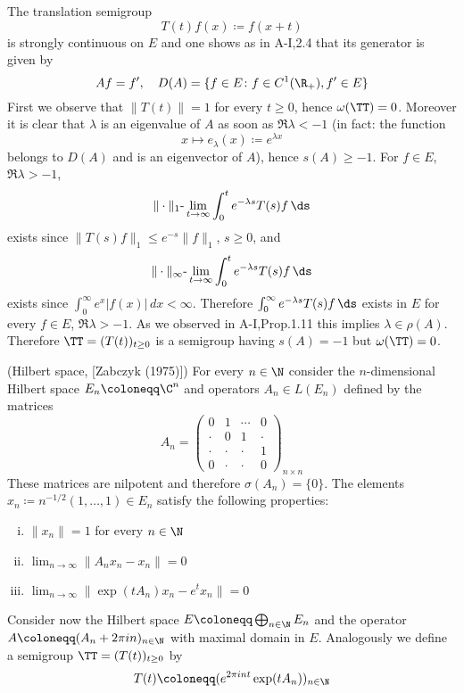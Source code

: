 The translation semigroup
\[
    T(t)f(x) \coloneqq f(x+t)
\]
is strongly continuous on $E$ and one shows as in A-I,2.4 that its generator is given by
\[
    Af = f', \quad D(A) = \{ f \in E \colon f \in C^{1}(\R_{+}), f' \in E \}
\]
First we observe that $\|T(t)\| = 1$ for every $t \geq 0$, hence $\omega(\TT) = 0$.
Moreover it is clear that $\lambda$ is an eigenvalue of $A$ as soon as $\Re\lambda < -1$ (in fact: the function
\[
    x \mapsto e_{\lambda}(x) \coloneqq e^{\lambda x}
\]
belongs to $D(A)$ and is an eigenvector of $A$), hence $s(A) \geq -1$.
For $f \in E$, $\Re\lambda > -1$,
\[
    \|\cdot\|_{1}\text{-}\lim_{t \to \infty} \int_{0}^{t} e^{-\lambda s}T(s)f \, \ds
\]
exists since $\|T(s)f\|_{1} \leq e^{-s}\|f\|_{1}$, $s \geq 0$, and
\[
    \|\cdot\|_{\infty}\text{-}\lim_{t \to \infty} \int_{0}^{t} e^{-\lambda s}T(s)f \, \ds
\]
exists since $\int_{0}^{\infty} e^{x}|f(x)| \, dx < \infty$.
Therefore $\int_{0}^{\infty} e^{-\lambda s}T(s)f \, \ds$ exists in $E$ for every $f \in E$, $\Re\lambda > -1$.
As we observed in A-I,Prop.1.11 this implies $\lambda \in \rho(A)$.
Therefore $\TT = (T(t))_{t\geq 0}$ is a semigroup having $s(A) = -1$ but $\omega(\TT) = 0$.
\begin{example}\label{ex:a3-1.4}
(Hilbert space, [Zabczyk (1975)])
For every $n \in \N$ consider the $n$-dimensional Hilbert space $E_{n} \coloneqq \C^{n}$ and operators $A_{n} \in L(E_{n})$ defined by the matrices
\[
    A_{n} = 
    \begin{pmatrix}
    0 & 1 & \cdots & 0 \\
    \cdot & 0 & 1 & \cdot \\
    \cdot & \cdot & \cdot & 1 \\
    0 & \cdot & \cdot & 0
    \end{pmatrix}_{n \times n}
\]
These matrices are nilpotent and therefore $\sigma(A_{n}) = \{0\}$.
The elements $x_{n} \coloneqq n^{-1/2}(1, \ldots, 1) \in E_{n}$ satisfy the following properties:

\begin{enumerate}[(i)]
\item 
$\|x_{n}\| = 1$ for every $n \in \N$

\item 
$\lim_{n \to \infty} \|A_{n}x_{n} - x_{n}\| = 0$

\item 
$\lim_{n \to \infty} \|\exp(tA_{n})x_{n} - e^{t}x_{n}\| = 0$

\end{enumerate}
Consider now the Hilbert space $E \coloneqq \bigoplus_{n \in \N} E_{n}$ and the operator $A \coloneqq (A_{n} + 2\pi in)_{n \in \N}$ with maximal domain in $E$.
Analogously we define a semigroup $\TT = (T(t))_{t \geq 0}$ by
\[
    T(t) \coloneqq (e^{2\pi int}\exp(tA_{n}))_{n \in \N}
\]
\end{example}

